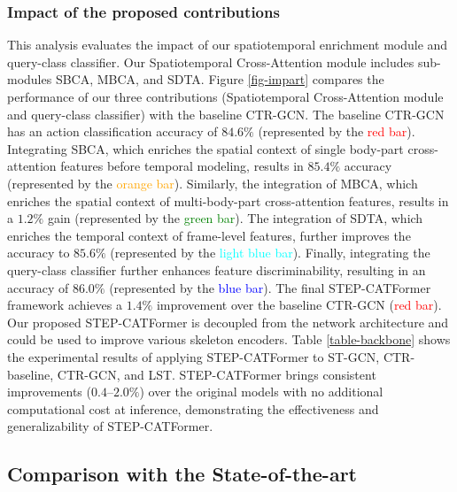 \documentclass{bmvc2k}
\begin{document}
\subsubsection*{Impact of the proposed contributions}
This analysis evaluates the impact of our spatiotemporal enrichment module and query-class classifier. Our Spatiotemporal Cross-Attention module includes sub-modules SBCA, MBCA, and SDTA. Figure \ref{fig-impart} compares the performance of our three contributions (Spatiotemporal Cross-Attention module and query-class classifier) with the baseline CTR-GCN. The baseline CTR-GCN has an action classification accuracy of $84.6\%$ (represented by the \textcolor{red}{red bar}). Integrating SBCA, which enriches the spatial context of single body-part cross-attention features before temporal modeling, results in $85.4\%$ accuracy (represented by the \textcolor{orange}{orange bar}). Similarly, the integration of MBCA, which enriches the spatial context of multi-body-part cross-attention features, results in a $1.2\%$ gain (represented by the \textcolor{green}{green bar}). The integration of SDTA, which enriches the temporal context of frame-level features, further improves the accuracy to $85.6\%$ (represented by the \textcolor{cyan}{light blue bar}). Finally, integrating the query-class classifier further enhances feature discriminability, resulting in an accuracy of $86.0\%$ (represented by the \textcolor{blue}{blue bar}). The final STEP-CATFormer framework achieves a $1.4\%$ improvement over the baseline CTR-GCN (\textcolor{red}{red bar}). Our proposed STEP-CATFormer is decoupled from the network architecture and could be used to improve various skeleton encoders. Table \ref{table-backbone} shows the experimental results of applying STEP-CATFormer to ST-GCN, CTR-baseline, CTR-GCN, and LST. STEP-CATFormer brings consistent improvements ($0.4$--$2.0\%$) over the original models with no additional computational cost at inference, demonstrating the effectiveness and generalizability of STEP-CATFormer.




\subsection{Comparison with the State-of-the-art}
\end{document}
